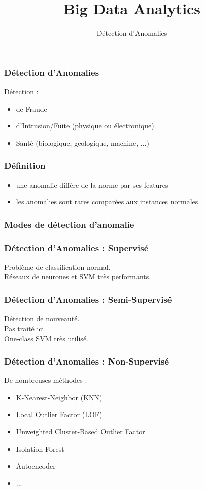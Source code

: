 \documentclass{formation}
\title{Big Data Analytics}
\subtitle{Détection d'Anomalies}
\begin{document}
\maketitle

\begin{frame}
  \frametitle{Détection d'Anomalies}
  Détection :
  \begin{itemize}
  \item de Fraude
  \item d'Intrusion/Fuite (physique ou électronique)
  \item Santé (biologique, geologique, machine, ...)
  \end{itemize}
\end{frame}

\begin{frame}
  \frametitle{Définition}
  \begin{itemize}
  \item une anomalie diffère de la norme par ses features
  \item les anomalies sont rares comparées aux instances normales
  \end{itemize}
\end{frame}

\begin{frame}
  \frametitle{Modes de détection d'anomalie}
\end{frame}

\begin{frame}
  \frametitle{Détection d'Anomalies : Supervisé}
  Problème de classification normal. \\
  Réseaux de neurones et SVM très performants.
\end{frame}

\begin{frame}
  \frametitle{Détection d'Anomalies : Semi-Supervisé}
  Détection de nouveauté. \\
  Pas traité ici. \\
  One-class SVM très utilisé.
\end{frame}

\begin{frame}
  \frametitle{Détection d'Anomalies : Non-Supervisé}
  De nombreuses méthodes : 
  \begin{itemize}
  \item K-Nearest-Neighbor (KNN)
  \item Local Outlier Factor (LOF)
  \item Unweighted Cluster-Based Outlier Factor
  \item Isolation Forest
  \item Autoencoder
  \item ...
  \end{itemize}
\end{frame}
\end{document}
